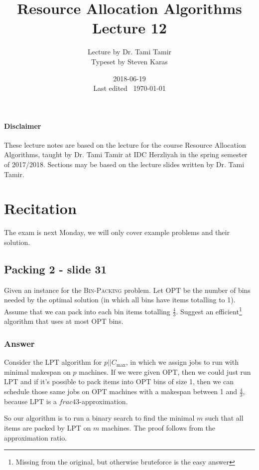 \documentclass{idc_msc}
\title{Resource Allocation Algorithms\\\large Lecture 12}
\date{2018-06-19 \\ Last edited \currenttime\ \today}
\author{Lecture by Dr. Tami Tamir\\Typeset by Steven Karas}
\begin{document}
\maketitle

\nocite{pinedo2016scheduling}

\paragraph{Disclaimer}

These lecture notes are based on the lecture for the course Resource Allocation Algorithms, taught by Dr. Tami Tamir at IDC Herzliyah in the spring semester of 2017/2018.
Sections may be based on the lecture slides written by Dr. Tami Tamir.

\section{Recitation}

The exam is next Monday, we will only cover example problems and their solution.

\subsection{Packing 2 - slide 31}

Given an instance for the \textsc{Bin-Packing} problem.
Let OPT be the number of bins needed by the optimal solution (in which all bins have items totalling to 1).
Assume that we can pack into each bin items totalling \(\frac{4}{3}\).
Suggest an efficient\footnote{Missing from the original, but otherwise bruteforce is the easy answer} algorithm that uses at most OPT bins.

\subsubsection{Answer}

Consider the LPT algorithm for \(p||C_{\max}\), in which we assign jobs to run with minimal makespan on \(p\) machines.
If we were given OPT, then we could just run LPT and if it's possible to pack items into OPT bins of size 1, then we can schedule those same jobs on OPT machines with a makespan between 1 and \(\frac{4}{3}\), because LPT is a \(frac{4}{3}\)-approximation.

So our algorithm is to run a binary search to find the minimal \(m\) such that all items are packed by LPT on \(m\) machines.
The proof follows from the approximation ratio.
\end{document}
